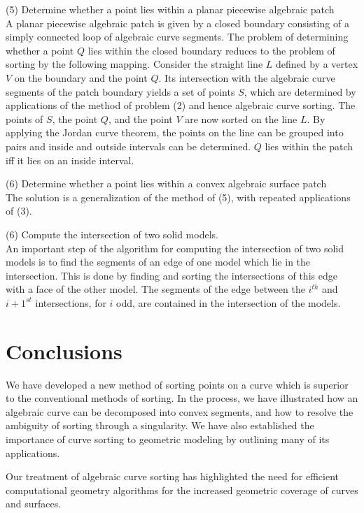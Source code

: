 (5) Determine whether a point lies within a planar piecewise algebraic patch\\
%
A planar piecewise algebraic patch is given by a closed boundary 
consisting of a simply connected loop of algebraic curve segments.
The problem of determining whether a point $Q$ lies within the closed boundary
reduces to the problem of sorting by the following mapping.
Consider the straight line $L$ defined by a vertex $V$ on the boundary and the
point $Q$. Its intersection with the algebraic curve segments of the patch boundary yields a set of points $S$, which are determined by applications of
the method of problem (2) and hence algebraic curve sorting.
The points of $S$, the point $Q$, and the point $V$ are now sorted on the
line $L$. By applying the Jordan curve theorem, the points on the line
can be grouped into pairs 
and inside and outside intervals can be determined.
$Q$ lies within the patch iff it lies on an inside interval.

(6) Determine whether a point lies within a convex algebraic surface patch\\
%
The solution is a generalization of the method of (5), with repeated 
applications of (3).

(6) Compute the intersection of two solid models.\\
%
An important step of the algorithm for computing the intersection of two
solid models is to find the segments of an edge of one model which lie in
the intersection.
This is done by finding and sorting the intersections of this edge with a 
face of the other model. 
The segments of the edge between the $i^{th}$ and $i+1^{st}$ intersections,
for $i$ odd, are contained in the intersection of the models.
	  
%	  
\section{Conclusions}

\tab We have developed a new method of sorting points on a curve
which is superior to the conventional methods of sorting.
In the process, we have illustrated how an algebraic curve can 
be decomposed into convex segments, and how to resolve the
ambiguity of sorting through a singularity.
We have also established the importance of curve sorting
to geometric modeling by outlining many of its applications.

Our treatment of algebraic curve sorting has highlighted the need for 
efficient computational geometry algorithms for the increased
geometric coverage of curves and surfaces.


